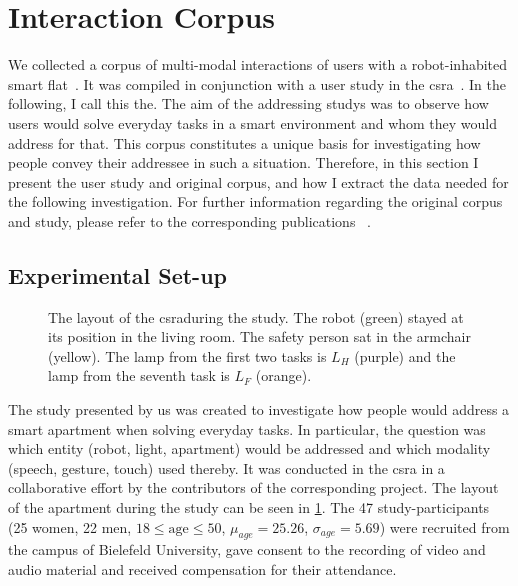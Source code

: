 \section{Interaction Corpus}

We collected a corpus of multi-modal interactions of \naive{} users with a \gls{robot}-inhabited smart flat~\cite{Holthaus2016a}.
It was compiled in conjunction with a user study in the \gls{csra}~\cite{Bernotat2016}.
In the following, I call this the.
The aim of the \glspl{addressing study} was to observe how \naive{} users would solve everyday tasks in a \gls{smart environment} and whom they would address for that.
This corpus constitutes a unique basis for investigating how people convey their \gls{addressee} in such a situation.
Therefore, in this section I present the user study and original corpus, and how I extract the data needed for the following investigation.
For further information regarding the original corpus and study, please refer to the corresponding publications ~\cite{Holthaus2016a,Bernotat2016}.

\subsection{Experimental Set-up}\label{sec:addressee.experimental.setup}

\begin{figure}[tbh]
    \centering
    \def\svgwidth{1.0\textwidth}
    
    \caption[Addressing apartment study layout.]{\label{fig:csra.map.addressee} The layout of the \gls{csra}during the study. The \gls{robot} (green) stayed at its position in the living room. The safety person sat in the armchair (yellow). The lamp from the first two tasks is \(L_H\) (purple) and the lamp from the seventh task is \(L_F\) (orange).}
\end{figure}


The study presented by us \cite{Bernotat2016} was created to investigate how \naive{} people would address a smart  \gls{apartment} when solving everyday tasks.
In particular, the question was which entity (\gls{robot}, light, apartment) would be addressed and which modality (speech, gesture, touch) used thereby.  
It was conducted in the \gls{csra} in a collaborative effort by the contributors of the corresponding project.
The layout of the \gls{apartment} during the study can be seen in \cref{fig:csra.map.addressee}.
The 47 study-participants (25 women, 22 men, \(18 \leq \text{age} \leq 50\), \(\mu_{age}=25.26\), \(\sigma_{age}=5.69\)) were recruited from the campus of Bielefeld University, gave consent to the recording of video and audio material and received  compensation for their attendance.

